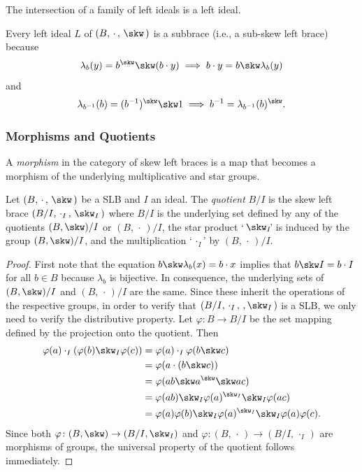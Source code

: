 \begin{rem}
    The intersection of a family of left ideals is a left ideal.
\end{rem}

\begin{rem}
    Every left ideal $L$ of $(B,\,\cdot\,,\,\skw\,)$ is a subbrace (i.e., a sub-skew left brace) because
    $$
        \lambda_b(y) = b^\skw\skw(b\cdot y)
            \implies b\cdot y = b\skw\lambda_b(y)
    $$
    and
    $$
        \lambda_{b^{-1}}(b) = (b^{-1})^\skw\skw1
            \implies b^{-1} = \lambda_{b^{-1}}(b)^\skw.
    $$
\end{rem}

\subsubsection*{Morphisms and Quotients}

\begin{defn}
    A \textsl{morphism} in the category of skew left braces is a map that becomes a morphism of the underlying multiplicative and star groups.
\end{defn}

\begin{prop}
    Let\/ $(B,\,\cdot\,,\,\skw\,)$ be a SLB and\/ $I$ an ideal. The \textsl{quotient\/} $B/I$ is the skew left brace\/ $(B/I,\,\cdot_I\,,\,\skw_I\,)$ where\/ $B/I$ is the underlying set defined by any of the quotients\/ $(B,\skw)/I$ or\/ $(B,\,\cdot\,)/I$, the star product `$\,\skw_I\!$' is induced by the group\/ $(B,\skw)/I$, and the multiplication `${\,\cdot_I}\!$' by\/ $(B,\,\cdot\,)/I$.
\end{prop}

\begin{proof}
    First note that the equation $b\skw\lambda_b(x)=b\cdot x$ implies that $b\skw I=b\cdot I$ for all $b\in B$ because $\lambda_b$ is bijective. In consequence, the underlying sets of $(B,\skw)/I$ and $(B,\,\cdot\,)/I$ are the same. Since these inherit the operations of the respective groups, in order to verify that $(B/I,\,\cdot_I\,,\,,\skw_I\,)$ is a SLB, we only need to verify the distributive property. Let $\varphi\colon B\to B/I$ be the set mapping defined by the projection onto the quotient. Then
    \begin{align*}
        \varphi(a)\cdot_I(\varphi(b)\skw_I\varphi(c))
            &= \varphi(a)\cdot_I\varphi(b\skw c)\\
            &= \varphi(a\cdot(b\skw c))\\
            &= \varphi(ab\skw a^\skw\skw ac)\\
            &= \varphi(ab)\skw_I\varphi(a)^{\skw_I}\skw_I\varphi(ac)\\
            &= \varphi(a)\varphi(b)\skw_I\varphi(a)^{\skw_I}
                \skw_I\varphi(a)\varphi(c).
    \end{align*}
    Since both $\varphi\colon(B,\skw)\to(B/I,\skw_I)$ and $\varphi\colon(B,\,\cdot\,)\to(B/I,\,\cdot_I\,)$ are morphisms of groups,
    the universal property of the quotient follows immediately.
\end{proof}

